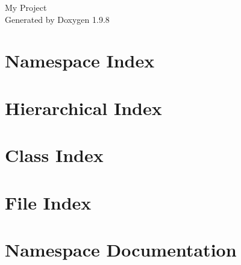 \documentclass[twoside]{book}
\newcommand{\+}{\discretionary{\mbox{\scriptsize$\hookleftarrow$}}{}{}}
\newcommand{\clearemptydoublepage}{%
    \newpage{\pagestyle{empty}\cleardoublepage}%
  }
\begin{document}
  \raggedbottom
    \hypersetup{pageanchor=false,
                bookmarksnumbered=true,
                pdfencoding=unicode
               }
  \begin{titlepage}
  \vspace*{7cm}
  \begin{center}%
  {\Large My Project}\\
  \vspace*{1cm}
  {\large Generated by Doxygen 1.9.8}\\
  \end{center}
  \end{titlepage}
  \clearemptydoublepage
  \tableofcontents
  \clearemptydoublepage
  \hypersetup{pageanchor=true}
\chapter{Namespace Index}

\chapter{Hierarchical Index}

\chapter{Class Index}

\chapter{File Index}

\chapter{Namespace Documentation}















\end{document}
